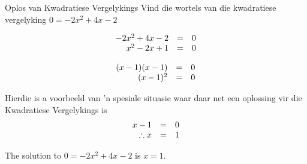 \begin{wex}{ Oplos van Kwadratiese Vergelykings }
{ Vind die wortels van die kwadratiese vergelyking  $0=-2{x}^{2}+4x-2$}
{

\begin{equation*}
\begin{array}{ccc}\hfill -2{x}^{2}+4x-2& =& 0\hfill \\ \hfill {x}^{2}-2x+1& =& 0\hfill \end{array}
\end{equation*}


\begin{equation*}
\begin{array}{ccc} \hfill (x-1)(x-1) &=& 0 \hfill \\
\hfill (x-1)^{2} &=&0 \hfill 
\end{array}
\end{equation*}

Hierdie is a voorbeeld van 'n spesiale situasie waar daar net een oplossing vir die Kwadratiese Vergelykings is
\begin{equation*}
\begin{array}{ccc} \hfill x -1 &=& 0 \hfill \\
\hfill \therefore x &=&1 \hfill 
\end{array}
\end{equation*}


 
The solution to $0=-2{x}^{2}+4x-2$ is $x=1$.
}
\end{wex}


